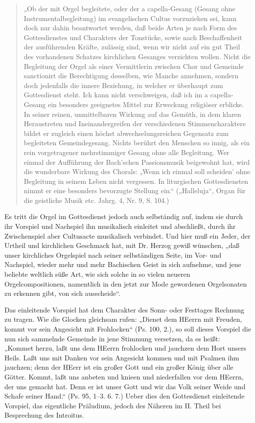 \begin{quote}
„Ob der mit Orgel begleitete, oder der a capella-Gesang (Gesang ohne Instrumentalbegleitung) im evangelischen Cultus vorzuziehen sei, kann doch nur dahin beantwortet werden, daß beide Arten je nach Form des Gottesdienstes und Charakters der Tonstücke, sowie nach Beschaffenheit der ausführenden Kräfte, zulässig sind, wenn wir nicht auf ein gut Theil des vorhandenen Schatzes kirchlichen Gesanges verzichten wollen. Nicht die Begleitung der Orgel als einer Vermittlerin zwischen Chor und Gemeinde sanctionirt die Berechtigung desselben, wie Manche annehmen, sondern doch jedenfalls die innere Beziehung, in welcher er überhaupt zum Gottesdienst steht. Ich kann nicht verschweigen, daß ich im a capella-Gesang ein besonders geeignetes Mittel zur Erweckung religiöser  erblicke. In seiner reinen, unmittelbaren Wirkung auf das Gemüth, in dem klaren Heraustreten und Ineinandergreifen der verschiedenen Stimmencharaktere bildet er zugleich einen höchst abwechselungsreichen Gegensatz zum begleiteten Gemeindegesang. Nichts berührt den Menschen so innig, als ein rein vorgetragener mehrstimmiger Gesang ohne alle Begleitung. Wer einmal der Aufführung der Bach’schen Passionsmusik beigewohnt hat, wird die wunderbare Wirkung des Chorals: „Wenn ich einmal soll scheiden’ ohne Begleitung in seinem Leben nicht vergessen. In liturgischen Gottesdiensten nimmt er eine besonders bevorzugte Stellung ein.“ („Halleluja“, Organ für die geistliche Musik etc. Jahrg. 4, Nr. 9, S. 104.)
\end{quote}

Es tritt die Orgel im Gottesdienst jedoch auch selbständig auf, indem sie durch ihr Vorspiel und Nachspiel ihn musikalisch einleitet und abschließt, durch ihr Zwischenspiel aber Cultusacte musikalisch verbindet. Und hier muß ein Jeder, der Urtheil und kirchlichen Geschmack hat, mit Dr. Herzog gewiß wünschen, „daß unser kirchliches Orgelspiel nach seiner selbständigen Seite, im Vor- und Nachspiel, wieder mehr und mehr Bachischen Geist in sich aufnehme, und jene beliebte weltlich süße Art, wie sich solche in so vielen neueren Orgelcompositionen, namentlich in den jetzt zur Mode gewordenen Orgelsonaten zu erkennen gibt, von sich ausscheide“.

Das einleitende Vorspiel hat dem Charakter des Sonn- oder Festtages Rechnung zu tragen. Wie die Glocken gleichsam rufen: „Dienet dem HEerrn mit Freuden, kommt vor sein Angesicht mit Frohlocken“ (Ps. 100, 2.), so soll dieses Vorspiel die nun sich sammelnde Gemeinde in jene Stimmung versetzen, da es heißt: „Kommet herzu, laßt uns dem HEerrn frohlocken und jauchzen dem Hort unsers Heils. Laßt uns mit Danken vor sein Angesicht kommen und mit Psalmen ihm jauchzen; denn der HEerr ist ein großer Gott und ein großer König über alle Götter. Kommt, laßt uns anbeten und knieen und niederfallen vor dem HEerrn, der uns gemacht hat. Denn er ist unser Gott und wir das Volk seiner Weide und Schafe seiner Hand.“ (Ps. 95, 1–3. 6. 7.) Ueber dies den Gottesdienst einleitende Vorspiel, das eigentliche Präludium, jedoch des Näheren im II. Theil bei Besprechung des Introitus.

